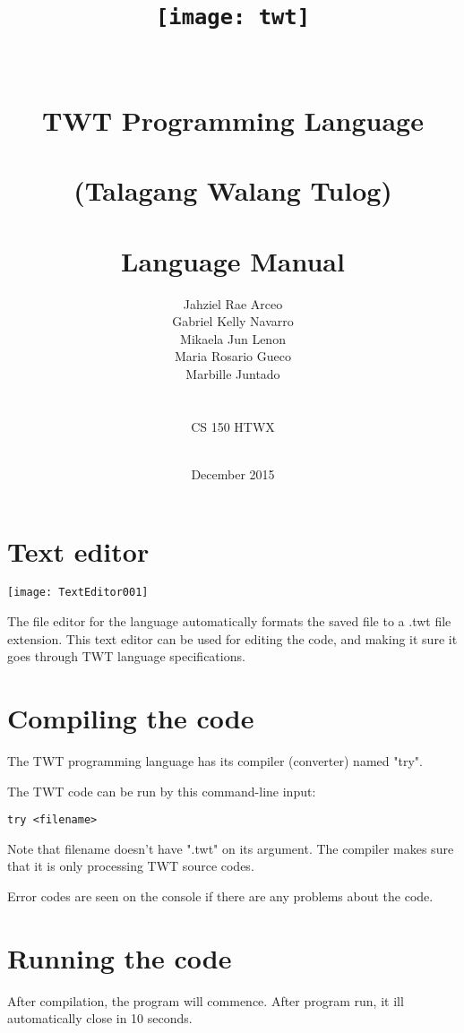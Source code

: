 \documentclass[11pt,a4paper]{report}
\title{\texttt{[image: twt]}\\~\\~\\ \LARGE{\textbf{TWT Programming
Language}}\\~\\ \large{(Talagang Walang Tulog)}\\~\\ \large{Language Manual}}
\date{~\\ December 2015}
\author{Jahziel Rae Arceo\\ Gabriel Kelly Navarro\\ Mikaela Jun Lenon\\ Maria
Rosario Gueco\\ Marbille Juntado\\~\\~\\ CS 150 HTWX}
\begin{document}
\maketitle

\section*{Text editor}

\begin{center}
\texttt{[image: TextEditor001]}
\end{center}

The file editor for the language automatically formats the saved file to a .twt
file extension. This text editor can be used for editing the code, and making it
sure it goes through TWT language specifications.

\section*{Compiling the code}

The TWT programming language has its compiler (converter) named "try".\par

\noindent The TWT code can be run by this command-line input:

\begin{lstlisting}
try <filename>
\end{lstlisting}

Note that filename doesn't have ".twt" on its argument. The compiler makes sure
that it is only processing TWT source codes.

Error codes are seen on the console if there are any problems about the code.

\section*{Running the code}

After compilation, the program will commence. After program run, it ill
automatically close in 10 seconds.
\end{document}
